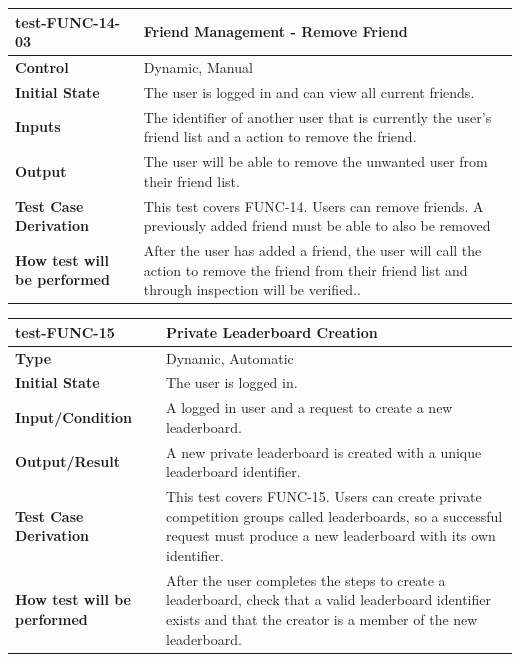 \documentclass[12pt, titlepage]{article}
\begin{document}
\vspace{1em}

\noindent\begin{tabularx}{\textwidth}{>{\raggedright\arraybackslash}p{3.5cm}X}
  \toprule
  \textbf{test-FUNC-14-03} & \textbf{Friend Management - Remove Friend}\\
  \midrule
  \textbf{Control} & Dynamic, Manual\\
  \textbf{Initial State} & The user is logged in and can view all current friends.\\
  \textbf{Inputs} & The identifier of another user that is currently the user's friend list and a action to remove the friend.\\
  \textbf{Output} & The user will be able to remove the unwanted user from their friend list.\\
  \textbf{Test Case Derivation} & This test covers FUNC-14. Users can remove friends. A previously added friend must be able to also be removed\\
  \textbf{How test will be performed} & After the user has added a friend, the user will call the action to remove the friend from their friend list and through inspection will be verified..\\
  \bottomrule
\end{tabularx}

\vspace{1em}

\noindent\begin{tabularx}{\textwidth}{>{\raggedright\arraybackslash}p{3.5cm}X}
  \toprule
  \textbf{test-FUNC-15} & \textbf{Private Leaderboard Creation}\\
  \midrule
  \textbf{Type} & Dynamic, Automatic\\
  \textbf{Initial State} & The user is logged in.\\
  \textbf{Input/Condition} & A logged in user and a request to create a new leaderboard.\\
  \textbf{Output/Result} & A new private leaderboard is created with a unique leaderboard identifier.\\
  \textbf{Test Case Derivation} & This test covers FUNC-15. Users can create private competition groups called leaderboards, so a successful request must produce a new leaderboard with its own identifier.\\
  \textbf{How test will be performed} & After the user completes the steps to create a leaderboard, check that a valid leaderboard identifier exists and that the creator is a member of the new leaderboard.\\
  \bottomrule
\end{tabularx}
\end{document}
